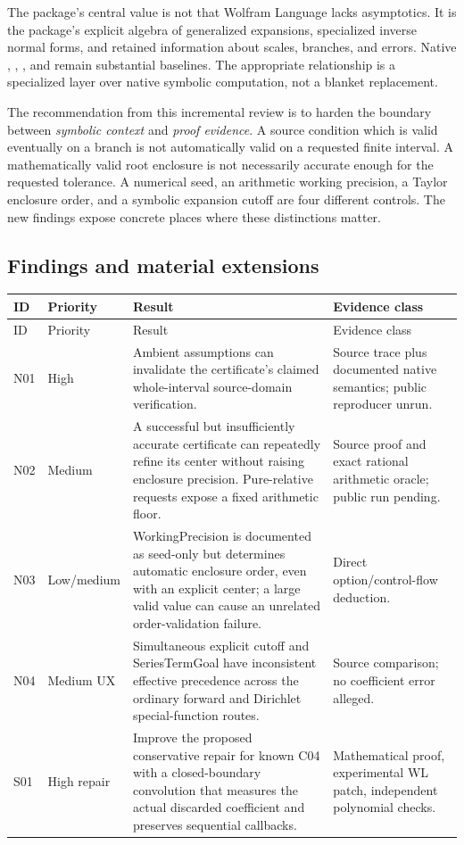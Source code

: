 \documentclass[11pt,a4paper]{article}
\newcommand{\code}[1]{\texttt{\detokenize{#1}}}
\begin{document}
The package's central value is not that Wolfram Language lacks asymptotics. It is the package's explicit algebra of generalized expansions, specialized inverse normal forms, and retained information about scales, branches, and errors. Native \code{Series}, \code{InverseSeries}, \code{Asymptotic}, and \code{AsymptoticSolve} remain substantial baselines. The appropriate relationship is a specialized layer over native symbolic computation, not a blanket replacement.\cite{wl-series,wl-inverse,wl-asymptotic,wl-solve,main}

The recommendation from this incremental review is to harden the boundary between \emph{symbolic context} and \emph{proof evidence}. A source condition which is valid eventually on a branch is not automatically valid on a requested finite interval. A mathematically valid root enclosure is not necessarily accurate enough for the requested tolerance. A numerical seed, an arithmetic working precision, a Taylor enclosure order, and a symbolic expansion cutoff are four different controls. The new findings expose concrete places where these distinctions matter.

\subsection{Findings and material extensions}
\begingroup\small
\begin{longtable}{@{}p{}p{}p{}p{}@{}}
\toprule ID & Priority & Result & Evidence class\\\midrule\endfirsthead
\toprule ID & Priority & Result & Evidence class\\\midrule\endhead
N01 & High & Ambient assumptions can invalidate the certificate's claimed whole-interval source-domain verification. & Source trace plus documented native semantics; public reproducer unrun.\\
N02 & Medium & A successful but insufficiently accurate certificate can repeatedly refine its center without raising enclosure precision. Pure-relative requests expose a fixed arithmetic floor. & Source proof and exact rational arithmetic oracle; public run pending.\\
N03 & Low/medium & WorkingPrecision is documented as seed-only but determines automatic enclosure order, even with an explicit center; a large valid value can cause an unrelated order-validation failure. & Direct option/control-flow deduction.\\
N04 & Medium UX & Simultaneous explicit cutoff and SeriesTermGoal have inconsistent effective precedence across the ordinary forward and Dirichlet special-function routes. & Source comparison; no coefficient error alleged.\\
S01 & High repair & Improve the proposed conservative repair for known C04 with a closed-boundary convolution that measures the actual discarded coefficient and preserves sequential callbacks. & Mathematical proof, experimental WL patch, independent polynomial checks.\\
\bottomrule
\end{longtable}
\endgroup
\end{document}
